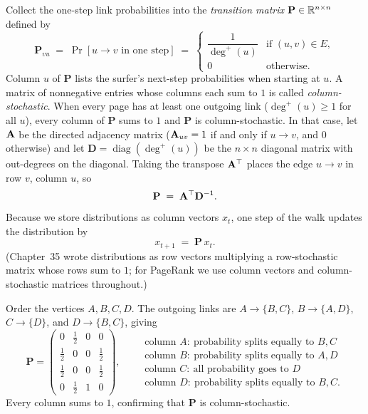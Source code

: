 Collect the one-step link probabilities into the \emph{transition matrix} $\mathbf{P} \in \mathbb{R}^{n\times n}$ defined by
\[
  \mathbf{P}_{vu} \;=\; \Pr[u \to v \text{ in one step}] \;=\;
  \begin{cases} \dfrac{1}{\deg^+(u)} & \text{if } (u,v) \in E,\\[1ex] 0 & \text{otherwise.}\end{cases}
\]
Column $u$ of $\mathbf{P}$ lists the surfer's next-step probabilities when starting at $u$. A matrix of nonnegative entries whose columns each sum to $1$ is called \emph{column-stochastic}. When every page has at least one outgoing link ($\deg^+(u) \ge 1$ for all $u$), every column of $\mathbf{P}$ sums to $1$ and $\mathbf{P}$ is column-stochastic. In that case, let $\mathbf{A}$ be the directed adjacency matrix ($\mathbf{A}_{uv}=1$ if and only if $u\to v$, and $0$ otherwise) and let $\mathbf{D}=\operatorname{diag}(\deg^+(u))$ be the $n \times n$ diagonal matrix with out-degrees on the diagonal. Taking the transpose $\mathbf{A}^\top$ places the edge $u \to v$ in row $v$, column $u$, so
\[
  \mathbf{P} \;=\; \mathbf{A}^\top \mathbf{D}^{-1}.
\]
Because we store distributions as column vectors $x_t$, one step of the walk updates the distribution by
\[
  x_{t+1} \;=\; \mathbf{P}\, x_t.
\]
(Chapter~35 wrote distributions as row vectors multiplying a row-stochastic matrix whose rows sum to $1$; for PageRank we use column vectors and column-stochastic matrices throughout.)

\begin{example}
\label{ch36:ex-Pmatrix}
Order the vertices $A,B,C,D$. The outgoing links are $A\to\{B,C\}$, $B\to\{A,D\}$, $C\to\{D\}$, and $D\to\{B,C\}$, giving
\[
  \mathbf{P} =
  \begin{pmatrix}
    0 & \tfrac12 & 0 & 0\\[4pt]
    \tfrac12 & 0 & 0 & \tfrac12\\[4pt]
    \tfrac12 & 0 & 0 & \tfrac12\\[4pt]
    0 & \tfrac12 & 1 & 0
  \end{pmatrix},
  \qquad
  \begin{array}{l}
  \text{column } A:\ \text{probability splits equally to } B,C\\[3pt]
  \text{column } B:\ \text{probability splits equally to } A,D\\[3pt]
  \text{column } C:\ \text{all probability goes to } D\\[3pt]
  \text{column } D:\ \text{probability splits equally to } B,C.
  \end{array}
\]
Every column sums to $1$, confirming that $\mathbf{P}$ is column-stochastic.
\end{example}

